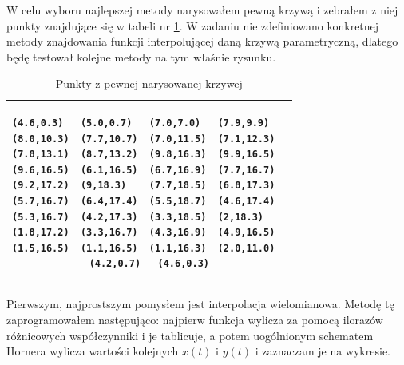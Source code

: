 \documentclass{article}
\begin{document}
W celu wyboru najlepszej metody narysowałem pewną krzywą i zebrałem z niej punkty znajdujące się w tabeli nr \ref{mrchw}. W zadaniu nie zdefiniowano konkretnej metody znajdowania funkcji interpolującej daną krzywą parametryczną, dlatego będę testował kolejne metody na tym właśnie rysunku.\\
\begin{table}[t]
\caption{Punkty z pewnej narysowanej krzywej}
\label{mrchw}
\begin{tabular}{|c|}
\hline
\begin{lstlisting}
(4.6,0.3)	(5.0,0.7)	(7.0,7.0)	(7.9,9.9)	
(8.0,10.3)	(7.7,10.7)	(7.0,11.5)	(7.1,12.3)	
(7.8,13.1)	(8.7,13.2)	(9.8,16.3)	(9.9,16.5)	
(9.6,16.5)	(6.1,16.5)	(6.7,16.9)	(7.7,16.7)	
(9.2,17.2)	(9,18.3)	(7.7,18.5)	(6.8,17.3)	
(5.7,16.7)	(6.4,17.4)	(5.5,18.7)	(4.6,17.4)	
(5.3,16.7)	(4.2,17.3)	(3.3,18.5)	(2,18.3)	
(1.8,17.2)	(3.3,16.7)	(4.3,16.9)	(4.9,16.5)	
(1.5,16.5)	(1.1,16.5)	(1.1,16.3)	(2.0,11.0)	
(4.2,0.7)	(4.6,0.3)
\end{lstlisting}\\
\hline
\end{tabular}
\end{table}


Pierwszym, najprostszym pomysłem jest interpolacja wielomianowa. Metodę tę zaprogramowałem następująco: najpierw funkcja wylicza za pomocą ilorazów różnicowych współczynniki i je tablicuje, a potem uogólnionym schematem Hornera wylicza wartości kolejnych $x(t)$ i $y(t)$ i zaznaczam je na wykresie.
\end{document}
